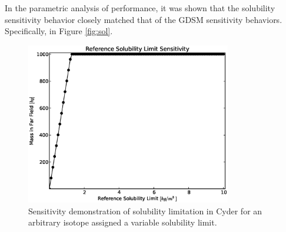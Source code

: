 In the parametric analysis of \Cyder performance, it was shown that the 
solubility sensitivity behavior closely matched that of the \gls{GDSM} 
sensitivity behaviors. Specifically, in Figure \ref{fig:sol}.

\begin{figure}[htbp!]
\begin{center}
\includegraphics[width=0.8\textwidth]{./chapters/demonstration/bench/sol.eps}
\end{center}
\caption{Sensitivity demonstration of solubility limitation in Cyder for an 
arbitrary isotope assigned a variable solubility limit. }
\label{fig:sol_result}
\end{figure}

